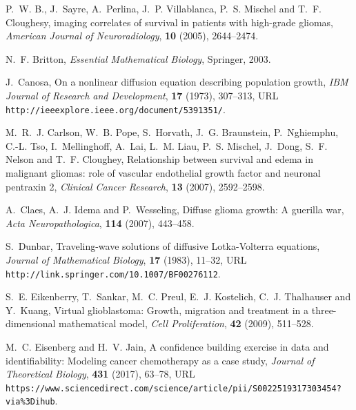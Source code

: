 \documentclass{aims}
\numberwithin{equation}{section}
\begin{document}
%
%

\providecommand{\href}[2]{#2}
\providecommand{\arxiv}[1]{\href{http://arxiv.org/abs/#1}{arXiv:#1}}
\providecommand{\url}[1]{\texttt{#1}}
\providecommand{\urlprefix}{URL }
\begin{thebibliography}{10}

\newblock P.~W. B., J.~Sayre, A.~Perlina, J.~P. Villablanca, P.~S. Mischel and
  T.~F. Cloughesy,
 imaging correlates of survival in patients with high-grade
  gliomas,
\newblock \emph{American Journal of Neuroradiology}, \textbf{10} (2005),
  2644--2474.

\newblock N.~F. Britton,
\newblock \emph{Essential Mathematical Biology},
\newblock Springer, 2003.

\newblock J.~Canosa,
\newblock On a nonlinear diffusion equation describing population growth,
\newblock \emph{IBM Journal of Research and Development}, \textbf{17} (1973),
  307--313,
\newblock \urlprefix\url{http://ieeexplore.ieee.org/document/5391351/}.

\newblock M.~R.~J. Carlson, W.~B. Pope, S.~Horvath, J.~G. Braunstein,
  P.~Nghiemphu, C.-L. Tso, I.~Mellinghoff, A.~Lai, L.~M. Liau, P.~S. Mischel,
  J.~Dong, S.~F. Nelson and T.~F. Cloughey,
\newblock Relationship between survival and edema in malignant gliomas: role of
  vascular endothelial growth factor and neuronal pentraxin 2,
\newblock \emph{Clinical Cancer Research}, \textbf{13} (2007), 2592--2598.

\newblock A.~Claes, A.~J. Idema and P.~Wesseling,
\newblock Diffuse glioma growth: A guerilla war,
\newblock \emph{Acta Neuropathologica}, \textbf{114} (2007), 443--458.

\newblock S.~Dunbar,
\newblock Traveling-wave solutions of diffusive Lotka-Volterra equations,
\newblock \emph{Journal of Mathematical Biology}, \textbf{17} (1983), 11--32,
\newblock \urlprefix\url{http://link.springer.com/10.1007/BF00276112}.

\newblock S.~E. Eikenberry, T.~Sankar, M.~C. Preul, E.~J. Kostelich, C.~J.
  Thalhauser and Y.~Kuang,
\newblock Virtual glioblastoma: Growth, migration and treatment in a
  three-dimensional mathematical model,
\newblock \emph{Cell Proliferation}, \textbf{42} (2009), 511--528.

\newblock M.~C. Eisenberg and H.~V. Jain,
\newblock A confidence building exercise in data and identifiability: Modeling
  cancer chemotherapy as a case study,
\newblock \emph{Journal of Theoretical Biology}, \textbf{431} (2017), 63--78,
\newblock
  \urlprefix\url{https://www.sciencedirect.com/science/article/pii/S0022519317303454?via{\%}3Dihub}.


\end{thebibliography}
\end{document}

